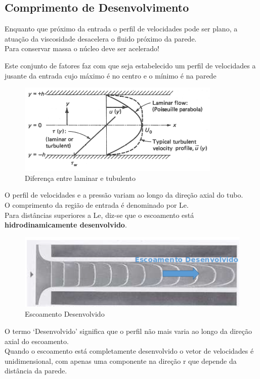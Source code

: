 \documentclass[a4paper, 12pt]{article}
\begin{document}
\subsection{Comprimento de Desenvolvimento}
	Enquanto que próximo  da entrada o perfil de velocidades pode ser plano, a atuação da viscosidade desacelera o fluido próximo da parede. \\
	
	Para conservar massa o núcleo deve ser acelerado!
	
	Este conjunto de fatores faz com que seja estabelecido um perfil de velocidades a jusante da entrada cujo máximo é no centro e o mínimo é na parede
	\begin{figure}[h]
		\centering
		\includegraphics[width=0.7\linewidth]{imagens/des2}
		\caption{Diferença entre laminar e tubulento}
		\label{fig:des2}
	\end{figure}

	O perfil de velocidades e a pressão variam ao longo da direção axial do tubo.\\
	O comprimento da região de entrada é denominado por Le.\\
	Para distâncias superiores a Le, diz-se que o escoamento está \textbf{hidrodinamicamente desenvolvido}.
	\begin{figure}[h]
		\centering
		\includegraphics[width=0.7\linewidth]{imagens/des}
		\caption{Escoamento Desenvolvido}
		\label{fig:des}
	\end{figure}
	O termo ‘Desenvolvido’  significa que o perfil não mais varia ao longo da direção axial do escoamento.\\
	
	Quando o escoamento está completamente desenvolvido o vetor de velocidades é unidimensional, com apenas uma componente na direção r que depende da distância da parede.\\
	
\end{document}
